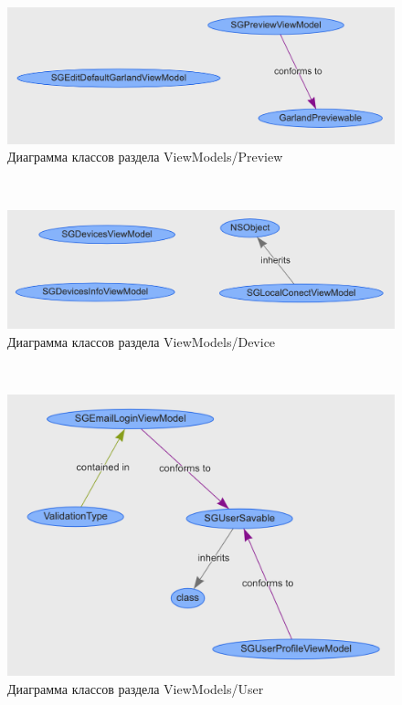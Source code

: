 ~
\begin{figure}[H]
\centering
	\includegraphics[scale=0.5]{figures/diagrams/class/preview.png}
	\caption{Диаграмма классов раздела ViewModels/Preview}
	\label{fig:appendices:classDiagram:preview}
\end{figure}
~
\begin{figure}[H]
\centering
	\includegraphics[scale=0.5]{figures/diagrams/class/vm_device.png}
	\caption{Диаграмма классов раздела ViewModels/Device}
	\label{fig:appendices:classDiagram:vm_device}
\end{figure}
~
\begin{figure}[H]
\centering
	\includegraphics[scale=0.5]{figures/diagrams/class/vm_user.png}
	\caption{Диаграмма классов раздела ViewModels/User}
	\label{fig:appendices:classDiagram:vm_user}
\end{figure}